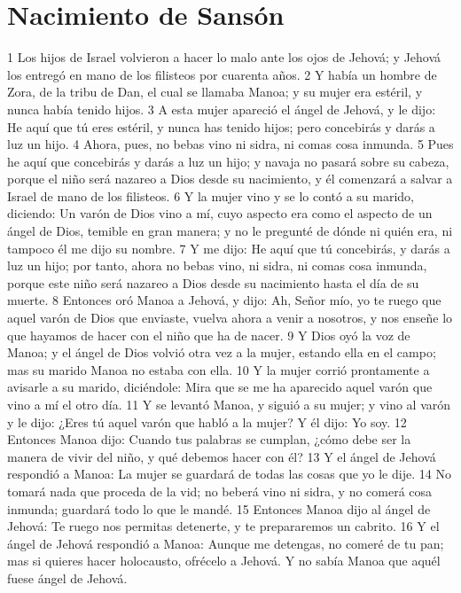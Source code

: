 \section*{Nacimiento de Sansón}

1 Los hijos de Israel volvieron a hacer lo malo ante los ojos de Jehová; y Jehová los entregó en mano de los filisteos por cuarenta años.
2 Y había un hombre de Zora, de la tribu de Dan, el cual se llamaba Manoa; y su mujer era estéril, y nunca había tenido hijos.
3 A esta mujer apareció el ángel de Jehová, y le dijo: He aquí que tú eres estéril, y nunca has tenido hijos; pero concebirás y darás a luz un hijo.
4 Ahora, pues, no bebas vino ni sidra, ni comas cosa inmunda.
5 Pues he aquí que concebirás y darás a luz un hijo; y navaja no pasará sobre su cabeza, porque el niño será nazareo a Dios desde su nacimiento, y él comenzará a salvar a Israel de mano de los filisteos.
6 Y la mujer vino y se lo contó a su marido, diciendo: Un varón de Dios vino a mí, cuyo aspecto era como el aspecto de un ángel de Dios, temible en gran manera; y no le pregunté de dónde ni quién era, ni tampoco él me dijo su nombre.
7 Y me dijo: He aquí que tú concebirás, y darás a luz un hijo; por tanto, ahora no bebas vino, ni sidra, ni comas cosa inmunda, porque este niño será nazareo a Dios desde su nacimiento hasta el día de su muerte.
8 Entonces oró Manoa a Jehová, y dijo: Ah, Señor mío, yo te ruego que aquel varón de Dios que enviaste, vuelva ahora a venir a nosotros, y nos enseñe lo que hayamos de hacer con el niño que ha de nacer.
9 Y Dios oyó la voz de Manoa; y el ángel de Dios volvió otra vez a la mujer, estando ella en el campo; mas su marido Manoa no estaba con ella.
10 Y la mujer corrió prontamente a avisarle a su marido, diciéndole: Mira que se me ha aparecido aquel varón que vino a mí el otro día.
11 Y se levantó Manoa, y siguió a su mujer; y vino al varón y le dijo: ¿Eres tú aquel varón que habló a la mujer? Y él dijo: Yo soy.
12 Entonces Manoa dijo: Cuando tus palabras se cumplan, ¿cómo debe ser la manera de vivir del niño, y qué debemos hacer con él?
13 Y el ángel de Jehová respondió a Manoa: La mujer se guardará de todas las cosas que yo le dije.
14 No tomará nada que proceda de la vid; no beberá vino ni sidra, y no comerá cosa inmunda; guardará todo lo que le mandé.
15 Entonces Manoa dijo al ángel de Jehová: Te ruego nos permitas detenerte, y te prepararemos un cabrito.
16 Y el ángel de Jehová respondió a Manoa: Aunque me detengas, no comeré de tu pan; mas si quieres hacer holocausto, ofrécelo a Jehová. Y no sabía Manoa que aquél fuese ángel de Jehová.
